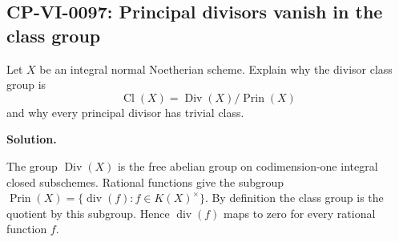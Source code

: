 
\subsection*{CP-VI-0097: Principal divisors vanish in the class group}

Let $X$ be an integral normal Noetherian scheme. Explain why the divisor class group is
\[
\operatorname{Cl}(X)=\operatorname{Div}(X)/\operatorname{Prin}(X)
\]
and why every principal divisor has trivial class.

\medskip
\noindent\textbf{Solution.}

The group $\operatorname{Div}(X)$ is the free abelian group on codimension-one integral closed subschemes. Rational functions give the subgroup $\operatorname{Prin}(X)=\{\operatorname{div}(f):f\in K(X)^\times\}$. By definition the class group is the quotient by this subgroup. Hence $\operatorname{div}(f)$ maps to zero for every rational function $f$.
